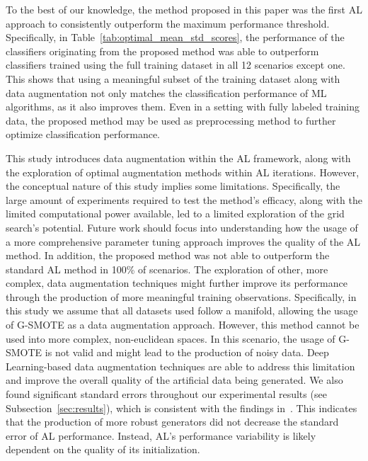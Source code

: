\documentclass[parskip=full]{scrartcl}
\begin{document}
To the best of our knowledge, the method proposed in this paper was the first
AL approach to consistently outperform the maximum performance threshold.
Specifically, in Table~\ref{tab:optimal_mean_std_scores}, the performance of
the classifiers originating from the proposed method was able to outperform
classifiers trained using the full training dataset in all 12 scenarios except
one. This shows that using a meaningful subset of the training dataset along
with data augmentation not only matches the classification performance of ML
algorithms, as it also improves them. Even in a setting with fully labeled
training data, the proposed method may be used as preprocessing method to
further optimize classification performance.

This study introduces data augmentation within the AL framework, along with
the exploration of optimal augmentation methods within AL iterations. However,
the conceptual nature of this study implies some limitations. Specifically,
the large amount of experiments required to test the method's efficacy, along
with the limited computational power available, led to a limited exploration
of the grid search's potential. Future work should focus into understanding
how the usage of a more comprehensive parameter tuning approach improves the
quality of the AL method. In addition, the proposed method was not able to
outperform the standard AL method in 100\% of scenarios. The exploration of
other, more complex, data augmentation techniques might further improve its
performance through the production of more meaningful training observations.
Specifically, in this study we assume that all datasets used follow a
manifold, allowing the usage of G-SMOTE as a data augmentation approach.
However, this method cannot be used into more complex, non-euclidean spaces.
In this scenario, the usage of G-SMOTE is not valid and might lead to the
production of noisy data. Deep Learning-based data augmentation techniques are
able to address this limitation and improve the overall quality of the
artificial data being generated. We also found significant standard errors
throughout our experimental results (see Subsection~\ref{sec:results}), which
is consistent with the findings in~\cite{Fonseca2021, Kottke2017}. This
indicates that the production of more robust generators did not decrease the
standard error of AL performance. Instead, AL's performance variability is
likely dependent on the quality of its initialization.
\end{document}
